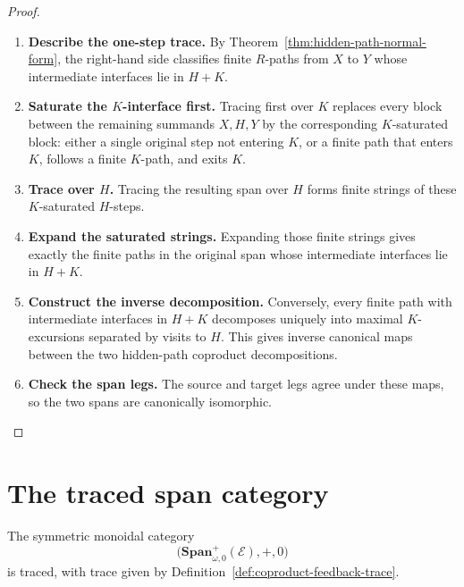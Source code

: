 \begin{proof}
\begin{enumerate}
  \item \textbf{Describe the one-step trace.}
  By Theorem~\ref{thm:hidden-path-normal-form}, the right-hand side classifies
  finite \(R\)-paths from \(X\) to \(Y\) whose intermediate interfaces lie in
  \(H+K\).

  \item \textbf{Saturate the \(K\)-interface first.}
  Tracing first over \(K\) replaces every block between the remaining summands
  \(X,H,Y\) by the corresponding \(K\)-saturated block: either a single
  original step not entering \(K\), or a finite path that enters \(K\), follows
  a finite \(K\)-path, and exits \(K\).

  \item \textbf{Trace over \(H\).}
  Tracing the resulting span over \(H\) forms finite strings of these
  \(K\)-saturated \(H\)-steps.

  \item \textbf{Expand the saturated strings.}
  Expanding those finite strings gives exactly the finite paths in the
  original span whose intermediate interfaces lie in \(H+K\).

  \item \textbf{Construct the inverse decomposition.}
  Conversely, every finite path with intermediate interfaces in \(H+K\)
  decomposes uniquely into maximal \(K\)-excursions separated by visits to
  \(H\). This gives inverse canonical maps between the two hidden-path
  coproduct decompositions.

  \item \textbf{Check the span legs.}
  The source and target legs agree under these maps, so the two spans are
  canonically isomorphic.
\end{enumerate}
\end{proof}

\section{The traced span category}
\label{sec:traced-span-category-feedback}

\begin{theorem}
\label{thm:span-traced-smc}
The symmetric monoidal category
\[
  \bigl(\mathbf{Span}^{+}_{\omega,0}(\mathcal E),+,0\bigr)
\]
is traced, with trace given by
Definition~\ref{def:coproduct-feedback-trace}.
\end{theorem}


